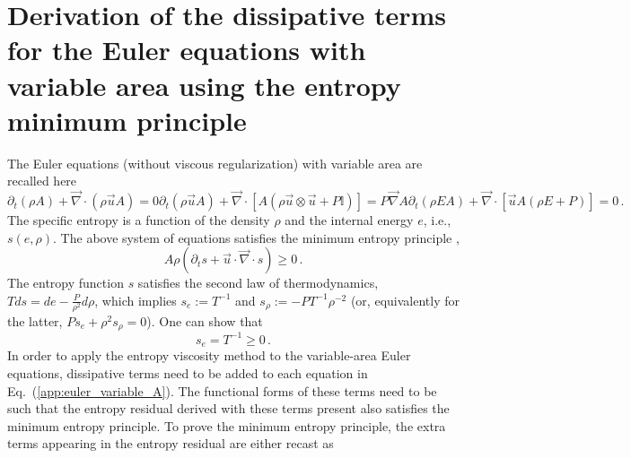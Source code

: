 \documentclass[review,10pt]{elsarticle}
\renewcommand{\div}{\vec{\nabla}\! \cdot \!}
\newcommand{\grad}{\vec{\nabla}}
\newcommand{\eqt}[1]{Eq.~(\ref{#1})}                     %
\begin{document}
\section{Derivation of the dissipative terms for the Euler equations with variable area using the entropy minimum principle} \label{app:diss_terms}
%
The Euler equations (without viscous regularization) with variable area are recalled here
%
\begin{subequations}
\label{app:euler_variable_A}
%
\begin{equation}
\partial_t \left( \rho A \right) + \div \left( \rho \vec{u} A \right) = 0 
\end{equation}
%
\begin{equation}
\partial_t \left( \rho \vec{u} A \right) + \div \left[A\left( \rho \vec{u} \otimes \vec{u} + P \mathbb{I} \right) \right] = P \grad A 
\end{equation}
% 
\begin{equation}
\partial_t \left( \rho E A \right) + \div \left[ \vec{u} A \left( \rho E + P \right) \right] = 0 \,.
\end{equation}
\end{subequations}
%
The specific entropy is a function of the density $\rho$ and the internal energy $e$, i.e., $s(e,\rho)$. The 
above system of equations satisfies the minimum entropy principle \cite{Leveque},
%
\begin{equation}
A \rho \left( \partial_t s + \vec{u} \cdot \div s \right) \geq 0 \, .
\end{equation}
%
The entropy function $s$ satisfies the second law of thermodynamics, $T ds = de - \frac{P}{\rho^2} d \rho$, 
which implies $s_e := T^{-1}$ and $s_\rho := -P T^{-1} \rho^{-2}$ (or, equivalently for the latter, $Ps_e + \rho^2 s_{\rho} = 0$). One can show that \cite{jlg}
%
\begin{equation}
s_e = T^{-1} \geq 0 \,.
\end{equation}
%
In order to apply the entropy viscosity method to the variable-area Euler equations, dissipative terms need to 
be added to each equation in \eqt{app:euler_variable_A}. The functional forms of these terms need to be such 
that the entropy residual derived with these terms present also satisfies the minimum entropy principle. 
To prove the minimum entropy principle, the extra terms appearing in the entropy residual are either recast as 
\end{document}
